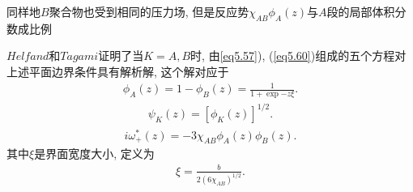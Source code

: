 同样地$B$聚合物也受到相同的压力场, 但是反应势$\chi_{AB}\phi_{A}(z)$与$A$段的局部体积分数成比例
\par
$Helfand$和$Tagami$证明了当$K=A, B$时, 由\ref{eq5.57}),
(\ref{eq5.60})组成的五个方程对上述平面边界条件具有解析解, 这个解对应于
\label{subsec.equations}
    \begin{equation}
        \begin{aligned}
            \phi_{A}(z)=1-\phi_{B}(z)=\frac{1}{1+\exp{-z\xi}}.
        \end{aligned}
        \label{eq5.65}
    \end{equation}
\label{subsec.equations}
    \begin{equation}
        \begin{aligned}
            \psi_{K}(z)=[\phi_{K}(z)]^{1/2}.
        \end{aligned}
        \label{eq5.66}
    \end{equation}
\label{subsec.equations}
    \begin{equation}
        \begin{aligned}
            i\omega^{*}_{+}(z)=-3\chi_{AB}\phi_{A}(z)\phi_{B}(z).
        \end{aligned}
        \label{eq5.67}
    \end{equation}
其中$\xi$是界面宽度大小, 定义为
\label{subsec.equations}
    \begin{equation}
        \begin{aligned}
            \xi=\frac{b}{2(6\chi_{AB})^{1/2}}.
        \end{aligned}
        \label{eq5.68}
    \end{equation}
\label{subsec.figure}
